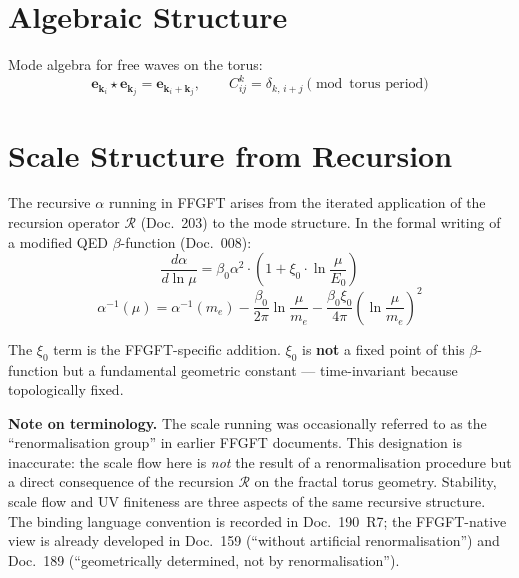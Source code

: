 \section{Algebraic Structure}

Mode algebra for free waves on the torus:
\begin{equation}
  \mathbf{e}_{\mathbf{k}_i} \star \mathbf{e}_{\mathbf{k}_j}
  = \mathbf{e}_{\mathbf{k}_i + \mathbf{k}_j},
  \qquad
  C_{ij}^k = \delta_{k,\,i+j} \pmod{\text{torus period}}
\end{equation}

\section{Scale Structure from Recursion}

The recursive $\alpha$ running in FFGFT arises from the iterated
application of the recursion operator $\mathcal{R}$ (Doc.~203) to the
mode structure. In the formal writing of a modified QED $\beta$-function
(Doc.~008):
\begin{equation}
  \frac{d\alpha}{d\ln\mu}
  = \beta_0\alpha^2\cdot\left(1 + \xi_0\cdot\ln\frac{\mu}{E_0}\right)
\end{equation}
\begin{equation}
  \alpha^{-1}(\mu)
  = \alpha^{-1}(m_e)
    - \frac{\beta_0}{2\pi}\ln\frac{\mu}{m_e}
    - \frac{\beta_0\xi_0}{4\pi}\left(\ln\frac{\mu}{m_e}\right)^2
\end{equation}

The $\xi_0$ term is the FFGFT-specific addition. $\xi_0$ is \textbf{not}
a fixed point of this $\beta$-function but a fundamental geometric constant
--- time-invariant because topologically fixed.

\medskip

\textbf{Note on terminology.}
The scale running was occasionally referred to as the
\enquote{renormalisation group} in earlier FFGFT documents. This
designation is inaccurate: the scale flow here is \emph{not} the result
of a renormalisation procedure but a direct consequence of the recursion
$\mathcal{R}$ on the fractal torus geometry. Stability, scale flow and
UV finiteness are three aspects of the same recursive structure.
The binding language convention is recorded in Doc.~190~R7; the
FFGFT-native view is already developed in Doc.~159 (\enquote{without
artificial renormalisation}) and Doc.~189 (\enquote{geometrically
determined, not by renormalisation}).

